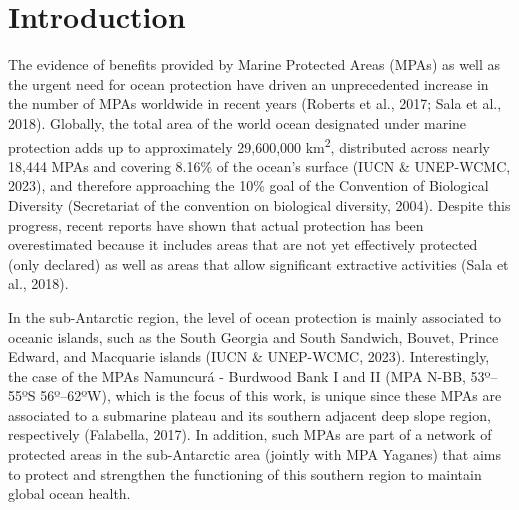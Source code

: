 \documentclass[preprint, 3p,
authoryear]{elsarticle} %
\begin{document}
\hypertarget{introduction}{%
\section{Introduction}\label{introduction}}

The evidence of benefits provided by Marine Protected Areas (MPAs) as
well as the urgent need for ocean protection have driven an
unprecedented increase in the number of MPAs worldwide in recent years
(Roberts et al., 2017; Sala et al., 2018). Globally, the total area of
the world ocean designated under marine protection adds up to
approximately 29,600,000 km\textsuperscript{2}, distributed across
nearly 18,444 MPAs and covering 8.16\% of the ocean's surface (IUCN \&
UNEP-WCMC, 2023), and therefore approaching the 10\% goal of the
Convention of Biological Diversity (Secretariat of the convention on
biological diversity, 2004). Despite this progress, recent reports have
shown that actual protection has been overestimated because it includes
areas that are not yet effectively protected (only declared) as well as
areas that allow significant extractive activities (Sala et al., 2018).

In the sub-Antarctic region, the level of ocean protection is mainly
associated to oceanic islands, such as the South Georgia and South
Sandwich, Bouvet, Prince Edward, and Macquarie islands (IUCN \&
UNEP-WCMC, 2023). Interestingly, the case of the MPAs Namuncurá -
Burdwood Bank I and II (MPA N-BB, 53º--55ºS 56º--62ºW), which is the
focus of this work, is unique since these MPAs are associated to a
submarine plateau and its southern adjacent deep slope region,
respectively (Falabella, 2017). In addition, such MPAs are part of a
network of protected areas in the sub-Antarctic area (jointly with MPA
Yaganes) that aims to protect and strengthen the functioning of this
southern region to maintain global ocean health.
\end{document}
